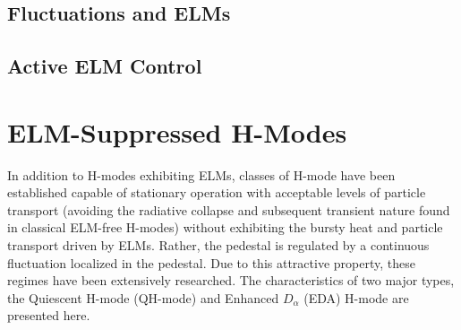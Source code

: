 \begin{figure}
 \pushtooutside
\end{figure}

\subsection{Fluctuations and ELMs}\label{subsec:hcr_elmy_fluct}

\subsection{Active ELM Control}\label{subsec:hcr_elmy_control}

\nicesectionending

\section{ELM-Suppressed H-Modes}\label{sec:hcr_elmsuppressed}

In addition to H-modes exhibiting ELMs, classes of H-mode have been established capable of stationary operation with acceptable levels of particle transport (avoiding the radiative collapse and subsequent transient nature found in classical ELM-free H-modes) without exhibiting the bursty heat and particle transport driven by ELMs.  Rather, the pedestal is regulated by a continuous fluctuation localized in the pedestal.  Due to this attractive property, these regimes have been extensively researched.  The characteristics of two major types, the Quiescent H-mode (QH-mode) and Enhanced $D_\alpha$ (EDA) H-mode are presented here.

